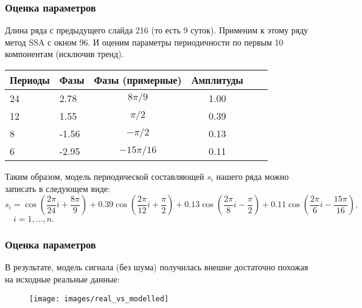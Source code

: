 \documentclass[intlimits, 9pt, unicode]{beamer}
\begin{document}
\begin{frame}
\frametitle{Оценка параметров}

Длина ряда с предыдущего слайда 216 (то есть 9 суток). Применим к этому ряду метод SSA с окном 96. И оценим параметры периодичности по первым 10 компонентам (исключив тренд).

\begin{table}[h!]
\centering
 \begin{tabular}{||llc c|ll|}
 \hline
 Периоды & Фазы & Фазы (примерные) &  Амплитуды \\ [0.5ex]
 \hline\hline
 24 & 2.78 & $8\pi/9$ & 1.00  \\
 \hline
 12 & 1.55 & $\pi/2$ & 0.39  \\
 \hline
 8 & -1.56 & $-\pi/2$ & 0.13  \\
 \hline
 6 & -2.95 & $-15\pi/16$ & 0.11  \\
 \hline
\end{tabular}
\end{table}

Таким образом, модель периодической составляющей $s_i$ нашего ряда можно записать в следующем виде:
$$ s_i = \cos(\frac{2\pi}{24}i + \frac{8\pi}{9}) + 
                    0.39\cos(\frac{2\pi}{12}i + \frac{\pi}{2}) + 
                    0.13\cos(\frac{2\pi}{8}i - \frac{\pi}{2}) + 
                    0.11\cos(\frac{2\pi}{6}i - \frac{15\pi}{16}),$$
$\quad i = 1, \dots, n.$

\end{frame}


\begin{frame}
\frametitle{Оценка параметров}

В результате, модель сигнала (без шума) получилась внешне достаточно похожая на исходные реальные данные:

\begin{figure}
\texttt{[image: images/real\_vs\_modelled]}
\end{figure}
\end{frame}
\end{document}
